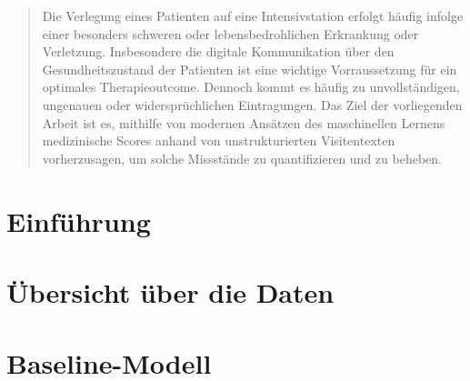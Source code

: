 \documentclass[
	abstract=true, %
	a4paper, %
	12pt, %
	bibliography=totoc, %
	headinclude, %
	headsepline,
	twoside,
	BCOR=1mm, %
	open=right %
]{scrreprt}
\begin{document}
	\pagestyle{empty}

	\renewcommand{\arraystretch}{1.15} %


	

	\begin{abstract} \thispagestyle{plain} %
	Die Verlegung eines Patienten auf eine Intensivstation erfolgt häufig infolge einer besonders schweren oder lebensbedrohlichen Erkrankung oder Verletzung. Insbesondere die digitale Kommunikation über den Gesundheitszustand der Patienten ist eine wichtige Vorraussetzung für ein optimales Therapieoutcome. Dennoch kommt es häufig zu unvollständigen, ungenauen oder widersprüchlichen Eintragungen. Das Ziel der vorliegenden Arbeit ist es, mithilfe von modernen Ansätzen des maschinellen Lernens medizinische Scores anhand von unstrukturierten Visitentexten vorherzusagen, um solche Missstände zu quantifizieren und zu beheben.
	\end{abstract}

	\pagestyle{headings} %
	\tableofcontents

	\setlength{\parskip}{.25em} %

	\chapter{Einführung}
	
	
	\chapter{Übersicht über die Daten} %
	
	
	\chapter{Baseline-Modell}\label{chap-vorgehensweise}
	
	
	
\end{document}
